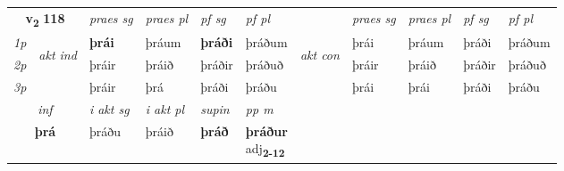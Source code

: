 \noindent
\begin{tabular}{lllllllllll} \toprule
\multicolumn{2}{c}{\textbf{v{\textsubscript{2}}} \Large{\textbf{118}}}  &  \textit{praes sg}  & \textit{praes pl}  &\textit{ pf sg} & \textit{pf pl} &  &  \textit{praes sg}  & \textit{praes pl}  & \textit{pf sg} & \textit{pf pl } \\*
	\cmidrule{3-6} \cmidrule{8-11}
 {\textit{1p}} & \multirow{3}{*}{\begin{turn}{90}\textit{akt ind}\end{turn}} & \textbf{þrái} & þráum & \textbf{þráði} & þráðum & \multirow{3}{*}{\begin{turn}{90}\textit{akt con}\end{turn}} &þrái & þráum & þráði & þráðum\\*
 {\textit{2p}} &  &  þráir  & þráið & þráðir & þráðuð & & þráir & þráið & þráðir & þráðuð \\*
{\textit{3p}} &  & þráir & þrá & þráði & þráðu & & þrái & þrái& þráði & þráðu \\*
\cmidrule{3-6} \cmidrule{8-11}

   \multicolumn{2}{c}{\textit{inf}}  & \textit{i akt sg} & \textit{i akt pl}    & \textit{supin}  & \textit{pp m} \\*
  \multicolumn{2}{c}{\textbf{þrá}} & þráðu  & þráið    &  \textbf{þráð}  & \specialcell{\textbf{þráður} \\ adj\textbf{\textsubscript{2-12}}} \\*
\end{tabular}

